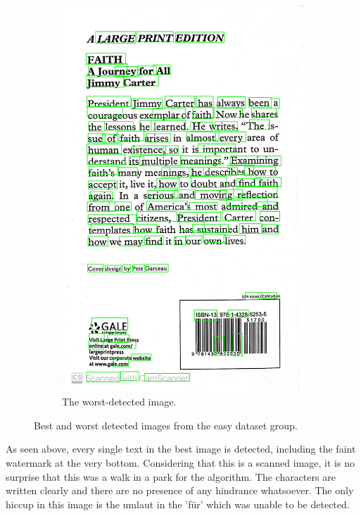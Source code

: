 \documentclass[10pt, a4paper]{article}
\begin{document}
\begin{figure}[h!]
\begin{subfigure}[b]{0.4\linewidth}
		\includegraphics[width=\linewidth]{jupyter/results/easy/sample_output_0.jpeg}
		\caption{The worst-detected image.}
	\end{subfigure}
	\caption{Best and worst detected images from the easy dataset group.}
	\label{fig:sampleeasybestworst}
  \end{figure}


As seen above, every single text in the best image is detected, including the faint watermark at the very bottom. Considering that this is a scanned image, it is no surprise that this was a walk in a park for the algorithm. The characters are written clearly and there are no presence of any hindrance whatsoever. The only hiccup in this image is the umlaut in the 'für' which was unable to be detected.
\end{document}
